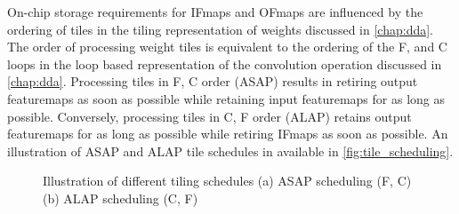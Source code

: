 On-chip storage requirements for IFmaps and OFmaps are influenced by the
ordering of tiles in the tiling representation of weights discussed in
\autoref{chap:dda}. The order of processing weight tiles is equivalent to the
ordering of the F, and C loops in the loop based representation of the
convolution operation discussed in \autoref{chap:dda}. Processing tiles in F, C
order (ASAP) results in retiring output featuremaps as soon as possible while retaining
input featuremaps for as long as possible. Conversely, processing tiles in C, F
order (ALAP) retains output featuremaps for as long as possible while retiring IFmaps
as soon as possible. An illustration of ASAP and ALAP tile schedules in
available in \autoref{fig:tile_scheduling}. 

\begin{figure}
    \centering
    \hspace{0.1cm} 
    \caption{Illustration of different tiling schedules (a) ASAP scheduling (F, C)  (b) ALAP scheduling (C, F)}
    \label{fig:tile_scheduling}
\end{figure}

